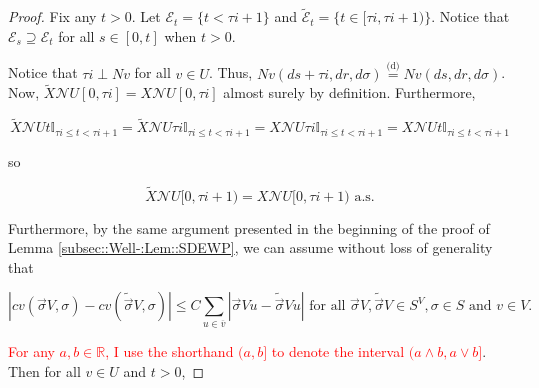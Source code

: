 \documentclass[12pt]{article}
\newcommand{\mb}{\mathbb}
\newcommand{\mc}{\mathcal}
\newcommand{\ov}{\overline}
\newcommand{\te}{\text}
\newcommand{\tr}{\textcolor{red}}
\newcommand{\ind}{\hspace{24pt}}
\newcommand{\deq}{\overset{\text{(d)}}{=}}			%
\renewcommand{\v}{v}							%
\newcommand{\vv}{u}								%
\renewcommand{\U}{U}							%
\renewcommand{\S}{S}							%
\newcommand{\s}{\sigma}							%
\newcommand{\sv}{\vec{\s}}						%
\renewcommand{\t}{t}							%
\renewcommand{\tt}{s}							%
\newcommand{\X}{X}								%
\newcommand{\IGr}{c}							%
\newcommand{\neigh}{\mc{N}}						%
\newcommand{\cl}{\ov}							%
\newcommand{\const}{C}							%
\newcommand{\poiss}{N}							%
\newcommand{\alt}[1]{\widetilde{#1}}			%
\newcommand{\rt}{\tau}							%
\newcommand{\evnt}{\mc{E}}						%
\begin{document}
\begin{proof}
\ind Fix any \(\t > 0\). Let \(\evnt_\t = \{\t < \rt{i+1}\}\) and \(\alt{\evnt}_\t = \{\t\in [\rt{i},\rt{i+1})\}\). Notice that \(\evnt_\tt \supseteq \evnt_\t\) for all \(\tt\in [0,\t]\) when \(\t > 0\). 

\ind Notice that \(\rt{i} \perp \poiss{\v}\) for all \(\v \in \U\). Thus, \(\poiss{\v}(d\tt+\rt{i},dr,d\s) \deq \poiss{\v}(d\tt,dr,d\s)\). Now, \(\alt{\X}{{\neigh{\U}}{}}[0,\rt{i}] = \X{\neigh{\U}}{[0,\rt{i}]}\) almost surely by definition. Furthermore,

\[\alt{\X}{{\neigh{\U}}{\t}}\mb{I}_{\rt{i}\leq \t < \rt{i+1}} = \alt{\X}{{\neigh{\U}}{\rt{i}}}\mb{I}_{\rt{i}\leq \t < \rt{i+1}} = \X{\neigh{\U}}{\rt{i}}\mb{I}_{\rt{i}\leq \t < \rt{i+1}} = \X{\neigh{\U}}{\t}\mb{I}_{\rt{i}\leq \t < \rt{i+1}}\]

so

\[\alt{\X}{{\neigh{\U}}{}}[0,\rt{i+1}) = \X{\neigh{\U}}{[0,\rt{i+1})} \te{ a.s.}\]

Furthermore, by the same argument presented in the beginning of the proof of Lemma \ref{subsec::Well-:Lem::SDEWP}, we can assume without loss of generality that 

\[|\IGr{\v}(\sv{ V}{},\s) - \IGr{\v}(\alt{\sv}{ V}{},\s)| \leq \const{}\sum_{\vv\in \cl{\v}} |\sv{ V}{\vv} - \alt{\sv}{ V}{\vv}|\te{ for all } \sv{ V}{},\alt{\sv}{ V}{}\in \S^ V,\s \in \S \te{ and } \v \in  V.\]

\tr{For any \(a,b\in \mb{R}\), I use the shorthand \((a,b]\) to denote the interval \((a\wedge b,a\vee b]\)}. Then for all \(v\in \U\) and \(\t > 0\),


\end{proof}
\end{document}
